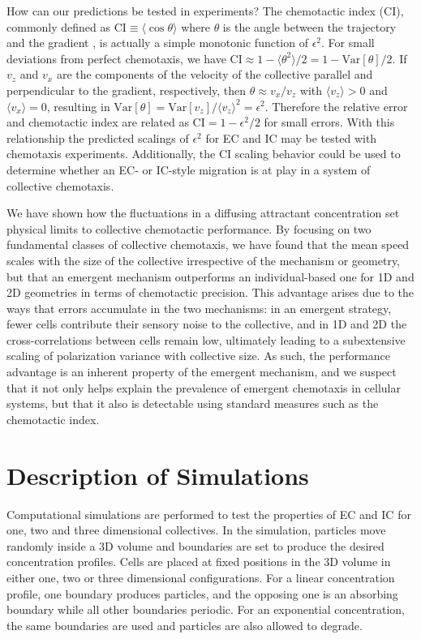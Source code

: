 How can our predictions be tested in experiments? The chemotactic index (CI), commonly defined as
$\text{CI} \equiv \langle \cos\theta \rangle$ where $\theta$ is the angle between the trajectory and the gradient \cite{van2007biased}, is actually a simple monotonic function of $\epsilon^2$. For small deviations from perfect chemotaxis, we have
$\text{CI} \approx 1 - \langle \theta^2 \rangle/2 = 1 - \text{Var}[\theta]/2$.
If $v_z$ and $v_x$ are the components of the velocity of the collective parallel and perpendicular to the gradient, respectively, then $\theta \approx v_x/v_z$ with $\langle v_z\rangle > 0$ and $\langle v_x\rangle = 0$, resulting in
$\text{Var}[\theta] = \text{Var}[v_z] / \langle v_z\rangle^2 = \epsilon^2$.
Therefore the relative error and chemotactic index are related as
$\text{CI} = 1 - \epsilon^2/2$ for small errors.
With this relationship the predicted scalings of $\epsilon^2$ for EC and IC may be tested with chemotaxis experiments. Additionally, the
CI scaling behavior could be used to determine whether an EC- or IC-style migration is at play in a system of collective chemotaxis.

We have shown how the fluctuations in a diffusing attractant concentration set physical limits to collective chemotactic performance. By focusing on two fundamental classes of collective chemotaxis, we have found that the mean speed scales with the size of the collective irrespective of the mechanism or geometry, but that an emergent mechanism outperforms an individual-based one for 1D and 2D geometries in terms of chemotactic precision.
This advantage arises due to the ways that errors accumulate in the two mechanisms: in an emergent strategy, fewer cells contribute their sensory noise to the collective, and in 1D and 2D the cross-correlations between cells remain low, ultimately leading to a subextensive scaling of polarization variance with collective size. As such, the performance advantage is an inherent property of the emergent mechanism, and we suspect that it not only helps explain the prevalence of emergent chemotaxis in cellular systems, but that it also is detectable using standard measures such as the chemotactic index.


\section{Description of Simulations} \label{sct:ch3_sim}

Computational simulations are performed to test the properties of EC and IC for one, two and three dimensional collectives. In the simulation, particles move randomly inside a 3D volume and boundaries are set to produce the desired concentration profiles. Cells are placed at fixed positions in the 3D volume in either one, two or three dimensional configurations. For a linear concentration profile, one boundary produces particles, and the opposing one is an absorbing boundary while all other boundaries periodic. For an exponential concentration, the same boundaries are used and particles are also allowed to degrade.

